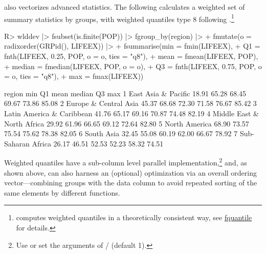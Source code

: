 \documentclass[nojss]{jss} %
\newcommand{\class}[1]{`\code{#1}'}
\newcommand{\fct}[1]{\code{#1()}}
\begin{document}
 also vectorizes advanced statistics. The following calculates a weighted set of summary statistics by groups, with weighted quantiles type 8 following \citet{hyndman1996sample}.\footnote{ computes weighted quantiles in a theoretically consistent way, see \href{https://sebkrantz.github.io/collapse/reference/fquantile.html}{fquantile} for details.}
%
\begin{Schunk}
\begin{Sinput}
R> wlddev |> fsubset(is.finite(POP)) |> fgroup_by(region) |>
+    fmutate(o = radixorder(GRPid(), LIFEEX)) |>
+    fsummarise(min = fmin(LIFEEX),
+               Q1 = fnth(LIFEEX, 0.25, POP, o = o, ties = "q8"),
+               mean = fmean(LIFEEX, POP),
+               median = fmedian(LIFEEX, POP, o = o),
+               Q3 = fnth(LIFEEX, 0.75, POP, o = o, ties = "q8"),
+               max = fmax(LIFEEX))
\end{Sinput}
\begin{Soutput}
                      region   min    Q1  mean median    Q3   max
1        East Asia & Pacific 18.91 65.28 68.45  69.67 73.86 85.08
2      Europe & Central Asia 45.37 68.68 72.30  71.58 76.67 85.42
3  Latin America & Caribbean 41.76 65.17 69.16  70.87 74.48 82.19
4 Middle East & North Africa 29.92 61.96 66.65  69.12 72.64 82.80
5              North America 68.90 73.57 75.54  75.62 78.38 82.05
6                 South Asia 32.45 55.08 60.19  62.00 66.67 78.92
7         Sub-Saharan Africa 26.17 46.51 52.53  52.23 58.32 74.51
\end{Soutput}
\end{Schunk}
%
Weighted quantiles have a sub-column level parallel implementation,\footnote{Use  or set the  arguments of \fct{fnth}/\fct{fmedian} (default 1).} and, as shown above, can also harness an (optional) optimization via an overall ordering vector---combining groups with the data column to avoid repeated sorting of the same elements by different functions. %
%
%
%
\end{document}
